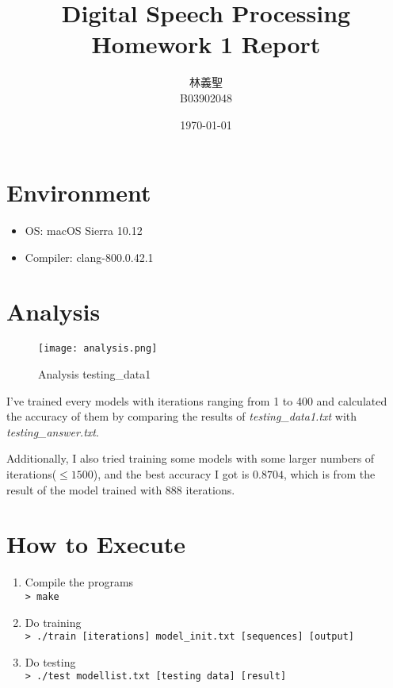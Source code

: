 \documentclass[14pt,a4paper]{extarticle}
\title{Digital Speech Processing\\Homework 1 Report\vspace{-1ex}}
\author{林義聖\\\small{B03902048}\vspace{-1ex}}
\date{\small{\today}\vspace{-1ex}}
\newcommand{\inlinecode}[1]{\colorbox{backcolour}{\color{darkgray}\texttt{\small{#1}}}}
\begin{document}
\maketitle
\thispagestyle{fancy}

\section*{Environment}

\begin{itemize}
	\item OS: macOS Sierra 10.12
	\item Compiler: clang-800.0.42.1
\end{itemize}

\section*{Analysis}

\begin{figure}[H]
\centering
\texttt{[image: analysis.png]}
\caption{Analysis testing\_data1}
\label{fig:analysis.png}
\end{figure}

I've trained every models with iterations ranging from 1 to 400 and calculated the accuracy of them by comparing the results of \textit{testing\_data1.txt} with \textit{testing\_answer.txt}.

Additionally, I also tried training some models with some larger numbers of iterations($\leq 1500$), and the best accuracy I got is $0.8704$, which is from the result of the model trained with $888$ iterations.

\section*{How to Execute}

\begin{enumerate}
	\item Compile the programs\\ \inlinecode{> make}
	\item Do training\\ \inlinecode{> ./train [iterations] model\_init.txt [sequences] [output]}
	\item Do testing\\ \inlinecode{> ./test modellist.txt [testing data] [result]}
\end{enumerate}
\end{document}
